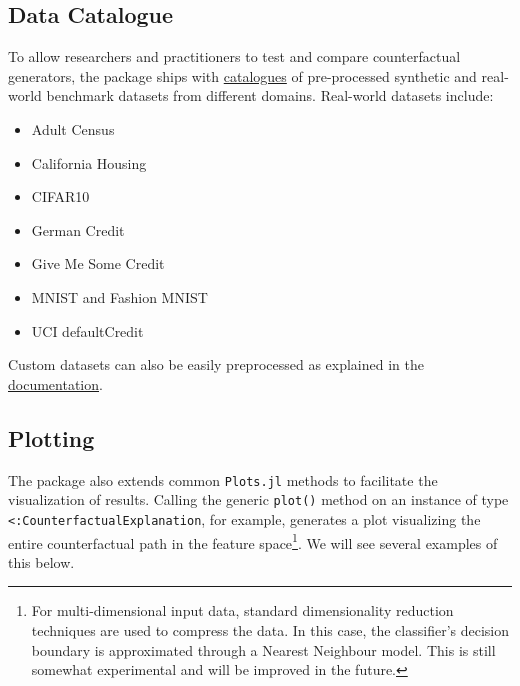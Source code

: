 \documentclass{juliacon}
\providecommand{\tightlist}{%
  \setlength{\itemsep}{0pt}\setlength{\parskip}{0pt}}\usepackage{longtable,booktabs,array}
\begin{document}
\hypertarget{data-catalogue}{%
\subsection{Data Catalogue}\label{data-catalogue}}

To allow researchers and practitioners to test and compare
counterfactual generators, the package ships with
\href{https://juliatrustworthyai.github.io/CounterfactualExplanations.jl/v0.1/tutorials/data_catalogue/}{catalogues}
of pre-processed synthetic and real-world benchmark datasets from
different domains. Real-world datasets include:

\begin{itemize}
\tightlist
\item
  Adult Census \autocite{becker1996adult}
\item
  California Housing \autocite{pace1997sparse}
\item
  CIFAR10 \autocite{krizhevsky2009learning}
\item
  German Credit \autocite{hoffman1994german}
\item
  Give Me Some Credit \autocite{kaggle2011give}
\item
  MNIST \autocite{lecun1998mnist} and Fashion MNIST
  \autocite{xiao2017fashion}
\item
  UCI defaultCredit \autocite{yeh2009comparisons}
\end{itemize}

Custom datasets can also be easily preprocessed as explained in the
\href{https://juliatrustworthyai.github.io/CounterfactualExplanations.jl/v0.1/tutorials/data_preprocessing/}{documentation}.

\hypertarget{plotting}{%
\subsection{Plotting}\label{plotting}}

The package also extends common \texttt{Plots.jl} methods to facilitate
the visualization of results. Calling the generic \texttt{plot()} method
on an instance of type \texttt{\textless{}:CounterfactualExplanation},
for example, generates a plot visualizing the entire counterfactual path
in the feature space\footnote{For multi-dimensional input data, standard
  dimensionality reduction techniques are used to compress the data. In
  this case, the classifier's decision boundary is approximated through
  a Nearest Neighbour model. This is still somewhat experimental and
  will be improved in the future.}. We will see several examples of this
below.
\end{document}
